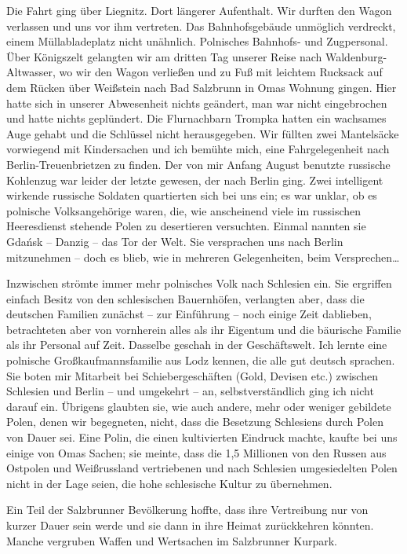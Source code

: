 Die Fahrt ging über Liegnitz. Dort längerer Aufenthalt. Wir durften den Wagon verlassen und uns vor ihm vertreten. Das Bahnhofsgebäude unmöglich verdreckt, einem Müllabladeplatz nicht unähnlich. Polnisches Bahnhofs- und Zugpersonal. Über Königszelt gelangten wir am dritten Tag unserer Reise nach Waldenburg-Altwasser, wo wir den Wagon verließen und zu Fuß mit leichtem Rucksack auf dem Rücken über Weißstein nach Bad Salzbrunn in Omas Wohnung gingen. Hier hatte sich in unserer Abwesenheit nichts geändert, man war nicht eingebrochen und hatte nichts geplündert. Die Flurnachbarn Trompka hatten ein wachsames Auge gehabt und die Schlüssel nicht herausgegeben. Wir füllten zwei Mantelsäcke vorwiegend mit Kindersachen und ich bemühte mich, eine Fahrgelegenheit nach Berlin-Treuenbrietzen zu finden. Der von mir Anfang August benutzte russische Kohlenzug war leider der letzte gewesen, der nach Berlin ging. Zwei intelligent wirkende russische Soldaten quartierten sich bei uns ein; es war unklar, ob es polnische Volksangehörige waren, die, wie anscheinend viele im russischen Heeresdienst stehende Polen zu desertieren versuchten. Einmal nannten sie Gdańsk -- Danzig -- das Tor der Welt. Sie versprachen uns nach Berlin mitzunehmen -- doch es blieb, wie in mehreren Gelegenheiten, beim Versprechen\dots

Inzwischen strömte immer mehr polnisches Volk nach Schlesien ein. Sie ergriffen einfach Besitz von den schlesischen Bauernhöfen, verlangten aber, dass die deutschen Familien zunächst -- zur Einführung -- noch einige Zeit dablieben, betrachteten aber von vornherein alles als ihr Eigentum und die bäurische Familie als ihr Personal auf Zeit. Dasselbe  geschah in der Geschäftswelt. Ich lernte eine polnische Großkaufmannsfamilie aus Lodz kennen, die alle gut deutsch sprachen. Sie boten mir Mitarbeit bei Schiebergeschäften (Gold, Devisen etc.) zwischen Schlesien und Berlin -- und umgekehrt -- an, selbstverständlich ging ich nicht darauf ein. Übrigens glaubten sie, wie auch andere, mehr oder weniger gebildete Polen, denen wir begegneten, nicht, dass die Besetzung Schlesiens durch Polen von Dauer sei. Eine Polin, die einen kultivierten Eindruck machte, kaufte bei uns einige von Omas Sachen; sie meinte, dass die 1,5 Millionen von den Russen aus Ostpolen und Weißrussland vertriebenen und nach Schlesien umgesiedelten Polen nicht in der Lage seien, die hohe schlesische Kultur zu übernehmen.

Ein Teil der Salzbrunner Bevölkerung hoffte, dass ihre Vertreibung nur von kurzer Dauer sein werde und sie dann in ihre Heimat zurückkehren könnten. Manche vergruben Waffen und Wertsachen im Salzbrunner Kurpark.

